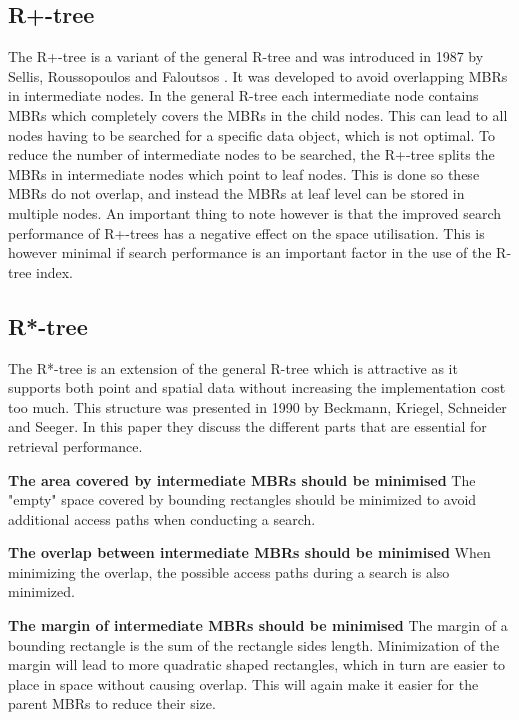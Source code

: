 \subsection{R+-tree}
The R+-tree is a variant of the general R-tree and was introduced in 1987 by Sellis, Roussopoulos and Faloutsos \cite{R+Tree}. It was developed to avoid overlapping MBRs in intermediate nodes. In the general R-tree each intermediate node contains MBRs which completely covers the MBRs in the child nodes. This can lead to all nodes having to be searched for a specific data object, which is not optimal. To reduce the number of intermediate nodes to be searched, the R+-tree splits the MBRs in intermediate nodes which point to leaf nodes. This is done so these MBRs do not overlap, and instead the MBRs at leaf level can be stored in multiple nodes. An important thing to note however is that the improved search performance of R+-trees has a negative effect on the space utilisation. This is however minimal if search performance is an important factor in the use of the R-tree index. 

\subsection{R*-tree}
The R*-tree is an extension of the general R-tree which is attractive as it supports both point and spatial data without increasing the implementation cost too much. This structure was presented in 1990 by Beckmann, Kriegel, Schneider and Seeger\cite{R*-tree}. In this paper they discuss the different parts that are essential for retrieval performance.\newline

\textbf{The area covered by intermediate MBRs should be minimised}\newline
The "empty" space covered by bounding rectangles should be minimized to avoid additional access paths when conducting a search. \newline

\textbf{The overlap between intermediate MBRs should be minimised}\newline
When minimizing the overlap, the possible access paths during a search is also minimized. \newline

\textbf{The margin of intermediate MBRs should be minimised}\newline
The margin of a bounding rectangle is the sum of the rectangle sides length. Minimization of the margin will lead to more quadratic shaped rectangles, which in turn are easier to place in space without causing overlap. This will again make it easier for the parent MBRs to reduce their size. \newline

